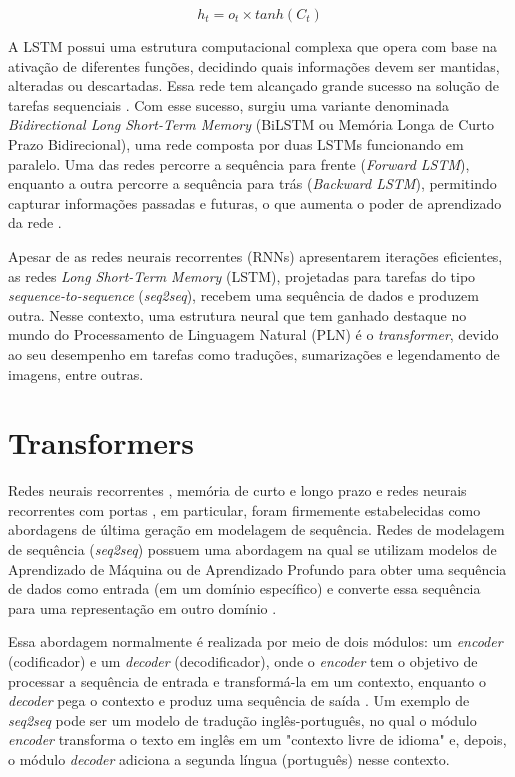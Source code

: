 \begin{equation}
    h_{t} = o_{t} \times tanh(C_{t})
    \label{eq:3.5.6}
\end{equation}

A LSTM possui uma estrutura computacional complexa que opera com base na ativação de diferentes funções, decidindo quais informações devem ser mantidas, alteradas ou descartadas. Essa rede tem alcançado grande sucesso na solução de tarefas sequenciais \cite{tai2015}. Com esse sucesso, surgiu uma variante denominada \textit{Bidirectional Long Short-Term Memory} (BiLSTM ou Memória Longa de Curto Prazo Bidirecional), uma rede composta por duas LSTMs funcionando em paralelo. Uma das redes percorre a sequência para frente (\textit{Forward LSTM}), enquanto a outra percorre a sequência para trás (\textit{Backward LSTM}), permitindo capturar informações passadas e futuras, o que aumenta o poder de aprendizado da rede \cite{graves2013}.

Apesar de as redes neurais recorrentes (RNNs) apresentarem iterações eficientes, as redes \textit{Long Short-Term Memory} (LSTM), projetadas para tarefas do tipo \textit{sequence-to-sequence} (\textit{seq2seq}), recebem uma sequência de dados e produzem outra. Nesse contexto, uma estrutura neural que tem ganhado destaque no mundo do Processamento de Linguagem Natural (PLN) é o \textit{transformer}, devido ao seu desempenho em tarefas como traduções, sumarizações e legendamento de imagens, entre outras.


\section {Transformers}

Redes neurais recorrentes \cite{ramakrishnan2018}, memória de curto e longo prazo \cite{hochreiter1997} e redes neurais recorrentes com portas \cite{chung2014}, em particular, foram firmemente estabelecidas como abordagens de última geração em modelagem de sequência. Redes de modelagem de sequência (\textit{seq2seq}) possuem uma abordagem na qual se utilizam modelos de Aprendizado de Máquina ou de Aprendizado Profundo para obter uma sequência de dados como entrada (em um domínio específico) e converte essa sequência para uma representação em outro domínio \cite{sutskever2014}.

Essa abordagem normalmente é realizada por meio de dois módulos: um \textit{encoder} (codificador) e um \textit{decoder} (decodificador), onde o \textit{encoder} tem o objetivo de processar a sequência de entrada e transformá-la em um contexto, enquanto o \textit{decoder} pega o contexto e produz uma sequência de saída \cite{sutskever2014}. Um exemplo de \textit{seq2seq} pode ser um modelo de tradução inglês-português, no qual o módulo \textit{encoder} transforma o texto em inglês em um "contexto livre de idioma" e, depois, o módulo \textit{decoder} adiciona a segunda língua (português) nesse contexto.


